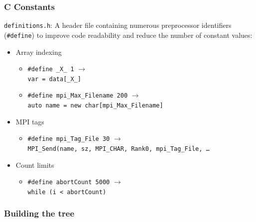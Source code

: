 \documentclass[usernames,dvipsnames]{beamer}
\begin{document}

\begin{frame}
	\frametitle{C Constants}
	
    \begin{block}{\texttt{definitions.h}:}
        A header file containing numerous preprocessor identifiers (\texttt{\#define}) to improve code readability and reduce the number of constant values:
        \begin{itemize}
            \item Array indexing
                \begin{itemize}
                    \item \texttt{\#define \_X\_ 1} $\rightarrow$  \\
                    \texttt{var = data[\_X\_]}
                    \item \texttt{\#define mpi\_Max\_Filename 200} $\rightarrow$ \\
                    \texttt{auto name = new char[mpi\_Max\_Filename]}
                \end{itemize}
            \item MPI tags
                \begin{itemize}
                    \item \texttt{\#define mpi\_Tag\_File 30} $\rightarrow$ \\
                    \texttt{MPI\_Send(name, sz, MPI\_CHAR, Rank0, mpi\_Tag\_File, \ldots}
                \end{itemize}
            \item Count limits
                \begin{itemize}
                    \item \texttt{\#define abortCount 5000} $\rightarrow$ \\
                    \texttt{while (i < abortCount)}
                \end{itemize}
    		\end{itemize}
    	\end{block}
		
\end{frame}

\subsubsection{Building the tree}
\end{document}
